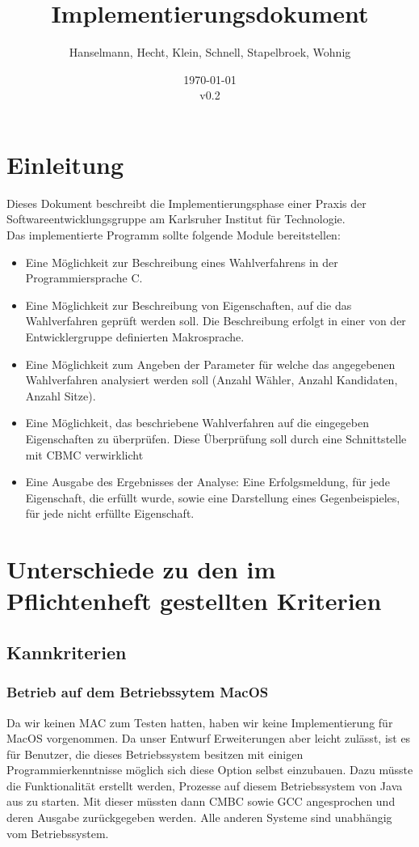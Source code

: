 \documentclass[a4paper]{scrreprt}
\begin{document}
\title{Implementierungsdokument}
\author{Hanselmann, Hecht, Klein, Schnell, Stapelbroek, Wohnig}
\date{\today\\v0.2}
\maketitle 
\tableofcontents	
\listoffigures


\chapter{Einleitung}
Dieses Dokument beschreibt die Implementierungsphase einer Praxis der Softwareentwicklungsgruppe am Karlsruher Institut für Technologie. \\
Das implementierte Programm sollte folgende Module bereitstellen: 
\begin{itemize}
\item Eine Möglichkeit zur Beschreibung eines Wahlverfahrens in der Programmiersprache C. 
\item Eine Möglichkeit zur Beschreibung von Eigenschaften, auf die das Wahlverfahren geprüft werden soll. Die Beschreibung erfolgt in einer von der Entwicklergruppe definierten Makrosprache.
\item Eine Möglichkeit zum Angeben der Parameter für welche das angegebenen Wahlverfahren analysiert werden soll (Anzahl Wähler, Anzahl Kandidaten, Anzahl Sitze). 
\item Eine Möglichkeit, das beschriebene Wahlverfahren auf die eingegeben Eigenschaften zu überprüfen. Diese Überprüfung soll durch eine Schnittstelle mit CBMC verwirklicht
\item Eine Ausgabe des Ergebnisses der Analyse: Eine Erfolgsmeldung, für jede Eigenschaft, die erfüllt wurde, sowie eine Darstellung eines Gegenbeispieles, für jede nicht erfüllte Eigenschaft. 
\end{itemize}


\chapter{Unterschiede zu den im Pflichtenheft gestellten Kriterien}

\section{Kannkriterien}

\subsection{Betrieb auf dem Betriebssytem MacOS} 
Da wir keinen MAC zum Testen hatten, haben wir keine Implementierung für MacOS
vorgenommen. Da unser Entwurf Erweiterungen aber leicht zulässt, ist es für
Benutzer, die dieses Betriebssystem besitzen mit einigen Programmierkenntnisse
möglich sich diese Option selbst einzubauen. Dazu müsste die Funktionalität erstellt werden, Prozesse auf diesem Betriebssystem von Java aus zu starten. Mit dieser müssten dann CMBC sowie GCC angesprochen und deren Ausgabe zurückgegeben werden. Alle anderen Systeme sind unabhängig vom Betriebssystem.
\end{document}
